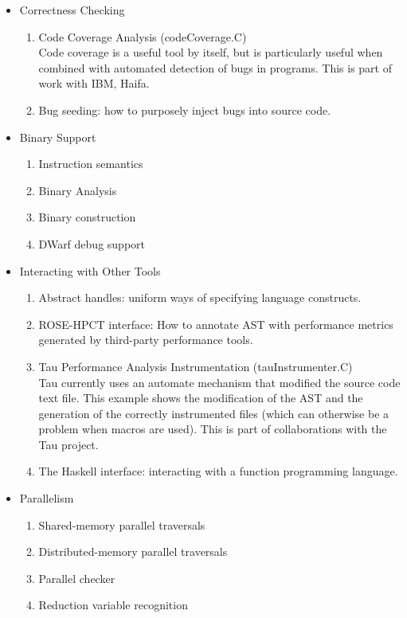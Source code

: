 \begin{itemize}
\begin{enumerate}
\end{enumerate}
   \item{Correctness Checking}
\begin{enumerate}
     \item Code Coverage Analysis (codeCoverage.C) \\
           Code coverage is a useful tool by itself, but is particularly useful when
           combined with automated detection of bugs in programs.  This is part of
           work with IBM, Haifa.
      \item Bug seeding: how to purposely inject bugs into source code.  

\end{enumerate}
   \item{Binary Support}
\begin{enumerate}
  \item Instruction semantics
  \item Binary Analysis
  \item Binary construction
  \item DWarf debug support
\end{enumerate}

   \item{Interacting with Other Tools}
\begin{enumerate}
      \item Abstract handles: uniform ways of specifying language
      constructs.
      \item ROSE-HPCT interface: How to annotate AST with performance
      metrics generated by third-party performance tools.
     \item Tau Performance Analysis Instrumentation (tauInstrumenter.C) \\
           Tau currently uses an automate mechanism that modified the source code text
           file.  This example shows the modification of the AST and the generation 
           of the correctly instrumented files (which can otherwise be a problem when
           macros are used).  This is part of collaborations with the Tau project.
      \item The Haskell interface: interacting with a function programming
      language. 
\end{enumerate}
 \item{Parallelism}
\begin{enumerate}
  \item Shared-memory parallel traversals
  \item Distributed-memory parallel traversals
  \item Parallel checker
  \item Reduction variable recognition
\end{enumerate}

\end{itemize}

